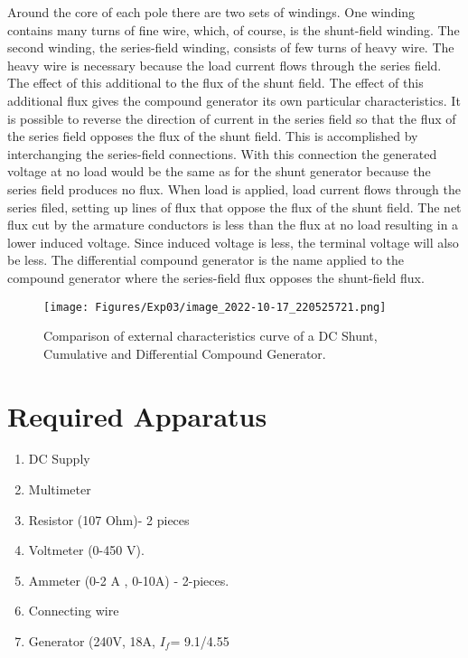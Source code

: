 \FloatBarrier
Around the core of each pole there are two sets of windings. One winding contains many turns of fine wire, which, of course, is the shunt-field winding. The second winding, the series-field winding, consists of few turns of heavy wire. The heavy wire is necessary because the load current flows through the series field. The effect of this additional to the flux of the shunt field. The effect of this additional flux gives the compound generator its own particular characteristics.  It is possible to reverse the direction of current in the series field so that the flux of the series field opposes the flux of the shunt field. This is accomplished by interchanging the series-field connections. With this connection the generated voltage at no load would be the same as for the shunt generator because the series field produces no flux. When load is applied, load current flows through the series filed, setting up lines of flux that oppose the flux of the shunt field. The net flux cut by the armature conductors is less than the flux at no load resulting in a lower induced voltage. Since induced voltage is less, the terminal voltage will also be less. The differential compound generator is the name applied to the compound generator where the series-field flux opposes the shunt-field flux.
\begin{figure}[hbt!]
\vspace{00mm}
    \centerline{\texttt{[image: Figures/Exp03/image\_2022-10-17\_220525721.png]}}
    \vspace{0mm}
    \caption{Comparison of external characteristics curve of a DC Shunt, Cumulative and Differential Compound Generator.}
    \label{fig:figg1}
\end{figure}
\newpage


\section{Required Apparatus}
\begin{enumerate}
\item DC Supply
\item Multimeter
\item Resistor (107 Ohm)- 2 pieces
\item Voltmeter (0-450 V). 
\item Ammeter (0-2 A , 0-10A) - 2-pieces.
\item Connecting wire
\item Generator (240V, 18A, $I_f$= 9.1/4.55
\end{enumerate}


